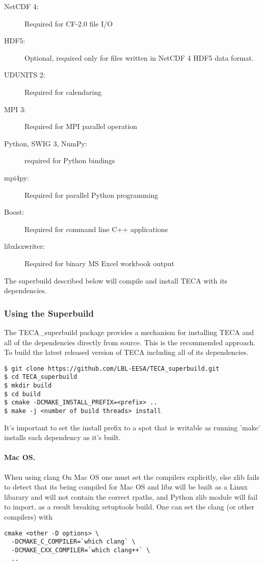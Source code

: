 \documentclass[a4paper,10pt,DIV=12]{scrreprt}
\begin{document}
\vspace{2mm}\hspace{0.2in}\begin{minipage}{0.8\textwidth}
\begin{description}
 \item[NetCDF 4:] Required for CF-2.0 file I/O
 \item[HDF5:] Optional, required only for files written in NetCDF 4 HDF5 data format.
 \item[UDUNITS 2:] Required for calendaring
 \item[MPI 3:] Required for MPI parallel operation
 \item[Python, SWIG 3, NumPy:] required for Python bindings
 \item[mpi4py:] Required for parallel Python programming
 \item[Boost:] Required for command line C++ applications
 \item[libxlsxwriter:] Required for binary MS Excel workbook output
\end{description}
\end{minipage}\vspace{2mm}

The superbuild described below will compile and install TECA with its dependencies.

\subsubsection{Using the Superbuild} The TECA\_superbuild package provides
a mechanism for installing TECA and all of the dependencies directly from source. 
This is the recommended approach.  To build the latest released version of TECA including all of its dependencies.

\begin{verbatim}
$ git clone https://github.com/LBL-EESA/TECA_superbuild.git
$ cd TECA_superbuild
$ mkdir build
$ cd build
$ cmake -DCMAKE_INSTALL_PREFIX=<prefix> ..
$ make -j <number of build threads> install
\end{verbatim}
It's important to set the install prefix to a spot that is writable as running 'make' installs each dependency as it's built.

\paragraph{Mac OS.} When using clang On Mac OS one must set the compilers explicitly, else zlib fails to detect that its being compiled for Mac OS and libz will be built as a Linux libarary and will not contain the correct rpaths, and Python zlib module will fail to import, as a result breaking setuptools build. One can set the clang (or other compilers) with
\begin{verbatim}
cmake <other -D options> \
  -DCMAKE_C_COMPILER=`which clang` \
  -DCMAKE_CXX_COMPILER=`which clang++` \
  ..
\end{verbatim}
\end{document}
